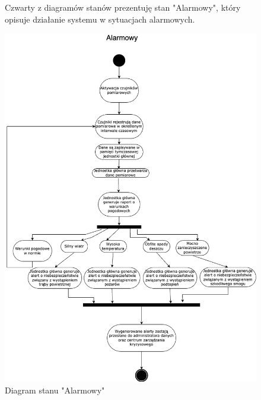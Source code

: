 \documentclass{article}
\begin{document}
\begin{figure}
    \centering
    \begin{minipage}{0.6\textwidth}
        \centering
        \large Czwarty z diagramów stanów prezentuję stan "Alarmowy", który opisuje działanie systemu w sytuacjach alarmowych.
    \end{minipage}
    \includegraphics[scale=0.5]{alarmowy.png}
    \caption{Diagram stanu "Alarmowy"}
    \label{etykieta4}
\end{figure}
\end{document}
